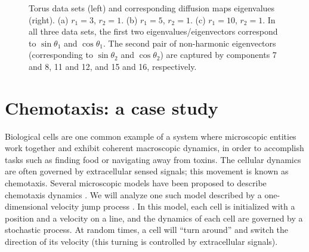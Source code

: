 \documentclass[preprint]{elsarticle}
\begin{document}
\begin{figure}[t]
\begin{subfigure}{\textwidth}
\caption{}
\end{subfigure}
%
\caption{Torus data sets (left) and corresponding diffusion maps eigenvalues (right). (a) $r_1 = 3$, $r_2 = 1$. (b) $r_1 = 5$, $r_2 = 1$. (c) $r_1 = 10$, $r_2 = 1$. In all three data sets, the first two eigenvalues/eigenvectors correspond to $\sin \theta_1$ and $\cos \theta_1$. The second pair of non-harmonic eigenvectors (corresponding to $\sin \theta_2$ and $\cos \theta_2$) are captured by components 7 and 8, 11 and 12, and 15 and 16, respectively.}
%
\label{fig:torus}
%
\end{figure}


\section{Chemotaxis: a case study}

%



Biological cells are one common example of a system where microscopic entities work together and exhibit coherent macroscopic dynamics, in order to accomplish tasks such as finding food or navigating away from toxins.
%
The cellular dynamics are often governed by extracellular sensed signals; this movement is known as chemotaxis. 
%
Several microscopic models have been proposed to describe chemotaxis dynamics \cite{othmer1988models, codling2008random}.
%
We will analyze one such model described by a one-dimensional velocity jump process \cite{othmer2000diffusion}.
%
In this model, each cell is initialized with a position and a velocity on a line, and the dynamics of each cell are governed by a stochastic process.
%
At random times, a cell will ``turn around'' and switch the direction of its velocity (this turning is controlled by extracellular signals). 
%
\end{document}
